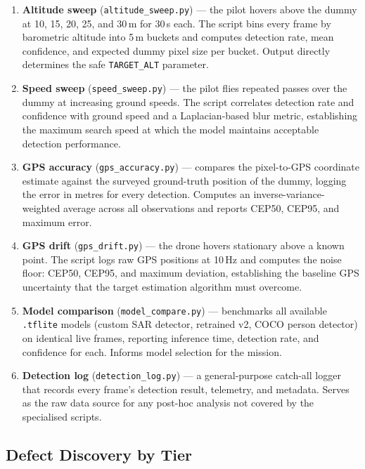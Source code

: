 \begin{enumerate}
    \item \textbf{Altitude sweep} (\texttt{altitude\_sweep.py}) --- the pilot hovers above the dummy at 10, 15, 20, 25, and 30\,m for 30\,s each. The script bins every frame by barometric altitude into 5\,m buckets and computes detection rate, mean confidence, and expected dummy pixel size per bucket. Output directly determines the safe \texttt{TARGET\_ALT} parameter.
    \item \textbf{Speed sweep} (\texttt{speed\_sweep.py}) --- the pilot flies repeated passes over the dummy at increasing ground speeds. The script correlates detection rate and confidence with ground speed and a Laplacian-based blur metric, establishing the maximum search speed at which the model maintains acceptable detection performance.
    \item \textbf{GPS accuracy} (\texttt{gps\_accuracy.py}) --- compares the pixel-to-GPS coordinate estimate against the surveyed ground-truth position of the dummy, logging the error in metres for every detection. Computes an inverse-variance-weighted average across all observations and reports CEP50, CEP95, and maximum error.
    \item \textbf{GPS drift} (\texttt{gps\_drift.py}) --- the drone hovers stationary above a known point. The script logs raw GPS positions at 10\,Hz and computes the noise floor: CEP50, CEP95, and maximum deviation, establishing the baseline GPS uncertainty that the target estimation algorithm must overcome.
    \item \textbf{Model comparison} (\texttt{model\_compare.py}) --- benchmarks all available \texttt{.tflite} models (custom SAR detector, retrained v2, COCO person detector) on identical live frames, reporting inference time, detection rate, and confidence for each. Informs model selection for the mission.
    \item \textbf{Detection log} (\texttt{detection\_log.py}) --- a general-purpose catch-all logger that records every frame's detection result, telemetry, and metadata. Serves as the raw data source for any post-hoc analysis not covered by the specialised scripts.
\end{enumerate}

\subsection{Defect Discovery by Tier}\label{sec:bug-discovery}

